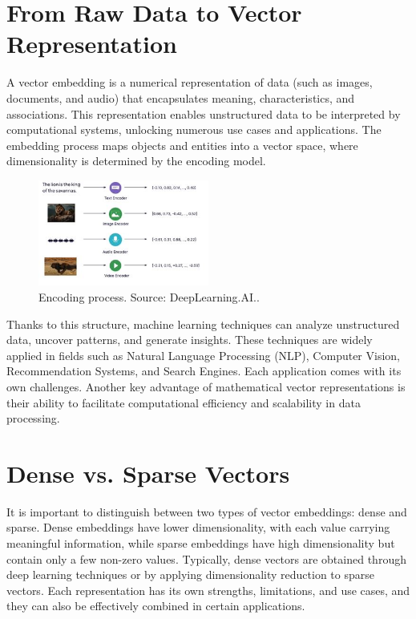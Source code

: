 \section{From Raw Data to Vector Representation}
A vector embedding is a numerical representation of data (such as images, documents, and audio) that encapsulates meaning, characteristics, and associations. This representation enables unstructured data to be interpreted by computational systems, unlocking numerous use cases and applications. The embedding process maps objects and entities into a vector space, where dimensionality is determined by the encoding model.

\begin{figure}[h]
    \centering
    \includegraphics[width=0.5\textwidth]{IMAGES/encode.JPG}
    \caption[Encoding process.]{Encoding process. Source: DeepLearning.AI.\footnotemark.}
    \label{fig:Encoding}
\end{figure}


Thanks to this structure, machine learning techniques can analyze unstructured data, uncover patterns, and generate insights. These techniques are widely applied in fields such as Natural Language Processing (NLP), Computer Vision, Recommendation Systems, and Search Engines. Each application comes with its own challenges. Another key advantage of mathematical vector representations is their ability to facilitate computational efficiency and scalability in data processing.
\section{Dense vs. Sparse Vectors}

It is important to distinguish between two types of vector embeddings: dense and sparse. Dense embeddings have lower dimensionality, with each value carrying meaningful information, while sparse embeddings have high dimensionality but contain only a few non-zero values. Typically, dense vectors are obtained through deep learning techniques or by applying dimensionality reduction to sparse vectors. Each representation has its own strengths, limitations, and use cases, and they can also be effectively combined in certain applications.

